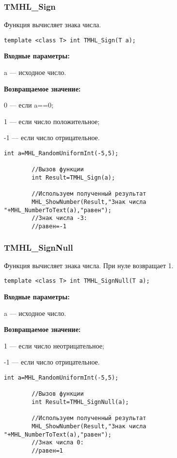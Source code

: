 \documentclass[a4paper,12pt]{article}
\begin{document}
\subsubsection{TMHL\_Sign}\label{TMHL_Sign}

Функция вычисляет знака числа.


\begin{lstlisting}[label=code_syntax_TMHL_Sign,caption=Синтаксис]
template <class T> int TMHL_Sign(T a);
\end{lstlisting}

\textbf{Входные параметры:}

 a --- исходное число.

\textbf{Возвращаемое значение:}

 0 --- если a==0;
 
 1 --- если число положительное;
 
 -1 --- если число отрицательное.


\begin{lstlisting}[label=code_use_TMHL_Sign,caption=Пример использования]
        int a=MHL_RandomUniformInt(-5,5);

        //Вызов функции
        int Result=TMHL_Sign(a);

        //Используем полученный результат
        MHL_ShowNumber(Result,"Знак числа "+MHL_NumberToText(a),"равен");
        //Знак числа -3:
        //равен=-1
\end{lstlisting}

\subsubsection{TMHL\_SignNull}\label{TMHL_SignNull}

Функция вычисляет знака числа. При нуле возвращает 1.


\begin{lstlisting}[label=code_syntax_TMHL_SignNull,caption=Синтаксис]
template <class T> int TMHL_SignNull(T a);
\end{lstlisting}

\textbf{Входные параметры:}

 a --- исходное число.

\textbf{Возвращаемое значение:}

 1 --- если число неотрицательное;
 
 -1 --- если число отрицательное.


\begin{lstlisting}[label=code_use_TMHL_SignNull,caption=Пример использования]
        int a=MHL_RandomUniformInt(-5,5);

        //Вызов функции
        int Result=TMHL_SignNull(a);

        //Используем полученный результат
        MHL_ShowNumber(Result,"Знак числа "+MHL_NumberToText(a),"равен");
        //Знак числа 0:
        //равен=1
\end{lstlisting}
\end{document}

